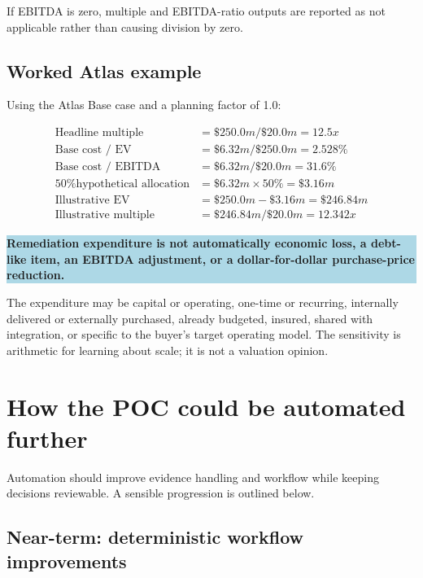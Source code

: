 \documentclass[11pt,a4paper]{article}
\newcommand{\callout}[1]{%
  \begin{center}
  \colorbox{lightblue}{\parbox{0.92\linewidth}{\color{navy}\textbf{#1}}}
  \end{center}}
\begin{document}
If EBITDA is zero, multiple and EBITDA-ratio outputs are reported as not applicable rather than causing division by zero.

\subsection{Worked Atlas example}

Using the Atlas Base case and a planning factor of 1.0:

\begin{align*}
\text{Headline multiple} &= \$250.0m / \$20.0m = 12.5x \\
\text{Base cost / EV} &= \$6.32m / \$250.0m = 2.528\% \\
\text{Base cost / EBITDA} &= \$6.32m / \$20.0m = 31.6\% \\
\text{50\% hypothetical allocation} &= \$6.32m \times 50\% = \$3.16m \\
\text{Illustrative EV} &= \$250.0m - \$3.16m = \$246.84m \\
\text{Illustrative multiple} &= \$246.84m / \$20.0m = 12.342x
\end{align*}

\callout{Remediation expenditure is not automatically economic loss, a debt-like item, an EBITDA adjustment, or a dollar-for-dollar purchase-price reduction.}

The expenditure may be capital or operating, one-time or recurring, internally delivered or externally purchased, already budgeted, insured, shared with integration, or specific to the buyer's target operating model. The sensitivity is arithmetic for learning about scale; it is not a valuation opinion.

\section{How the POC could be automated further}

Automation should improve evidence handling and workflow while keeping decisions reviewable. A sensible progression is outlined below.

\subsection{Near-term: deterministic workflow improvements}
\end{document}
